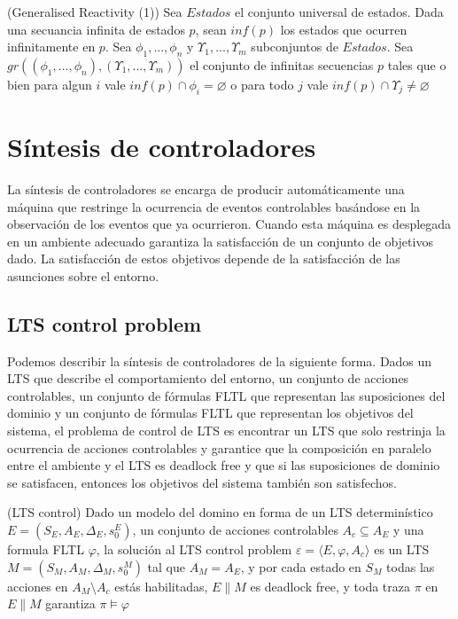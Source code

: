 \begin{definition}{(Generalised Reactivity (1))}
Sea $Estados$ el conjunto universal de estados. Dada una secuancia infinita de estados $p$, sean $inf(p)$ los estados que
ocurren infinitamente en $p$. Sea $\phi_{1}, ..., \phi_{n}$ y $\varUpsilon_{1}, ..., \varUpsilon_{m}$ subconjuntos de $Estados$. Sea\\
$gr((\phi_{1}, ..., \phi_{n}), (\varUpsilon_{1}, ..., \varUpsilon_{m}))$ el conjunto de infinitas secuencias $p$ tales que
o bien para algun $i$ vale $inf(p)\cap\phi_{i} = \varnothing$ o para todo $j$ vale $inf(p)\cap\varUpsilon_{j} \neq \varnothing$
\end{definition}

\section{Síntesis de controladores}

La síntesis de controladores se encarga de producir automáticamente una máquina que restringe la ocurrencia de eventos
controlables basándose en la observación de los eventos que ya ocurrieron. Cuando esta máquina es desplegada en un ambiente
adecuado garantiza la satisfacción de un conjunto de objetivos dado. La satisfacción de estos objetivos depende de la
satisfacción de las asunciones sobre el entorno.

\subsection{LTS control problem}

Podemos describir la síntesis de controladores de la siguiente forma. Dados un LTS que describe el comportamiento
del entorno, un conjunto de acciones controlables, un conjunto de fórmulas FLTL que representan las suposiciones
del dominio y un conjunto de fórmulas FLTL que representan los objetivos del sistema, el problema de control de
LTS \cite{LTSControl} es encontrar un LTS que solo restrinja la ocurrencia de acciones controlables y garantice que la composición
en paralelo entre el ambiente y el LTS es deadlock free y que si las suposiciones de dominio se satisfacen, entonces
los objetivos del sistema también son satisfechos.

\begin{definition}{(LTS control)}
Dado un modelo del domino en forma de un LTS determinístico $E = (S_{E}, A_{E}, \Delta_{E}, s_{0}^{E})$, un conjunto de
acciones controlables $A_{c} \subseteq A_{E}$ y una formula FLTL $\varphi$, la solución al LTS control problem
$\varepsilon = \langle E, \varphi, A_{c} \rangle$ es un LTS $M = (S_{M}, A_{M}, \Delta_{M}, s_{0}^{M})$ tal que
$A_{M} = A_{E}$, y por cada estado en $S_{M}$ todas las acciones en $A_{M} \setminus A_{c}$ estás habilitadas, $E \parallel M$
es deadlock free, y toda traza $\pi$ en $E \parallel M$ garantiza $\pi \vDash \varphi$
\end{definition}

